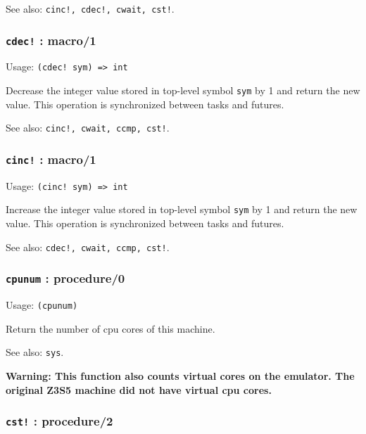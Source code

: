 \documentclass[
]{article}
\newcommand{\passthrough}[1]{#1}
\begin{document}
See also: \passthrough{\lstinline"cinc!, cdec!, cwait, cst!"}.

\hypertarget{cdec-macro1}{%
\subsubsection{\texorpdfstring{\texttt{cdec!} :
macro/1}{cdec! : macro/1}}\label{cdec-macro1}}

Usage: \passthrough{\lstinline"(cdec! sym) => int"}

Decrease the integer value stored in top-level symbol
\passthrough{\lstinline!sym!} by 1 and return the new value. This
operation is synchronized between tasks and futures.

See also: \passthrough{\lstinline"cinc!, cwait, ccmp, cst!"}.

\hypertarget{cinc-macro1}{%
\subsubsection{\texorpdfstring{\texttt{cinc!} :
macro/1}{cinc! : macro/1}}\label{cinc-macro1}}

Usage: \passthrough{\lstinline"(cinc! sym) => int"}

Increase the integer value stored in top-level symbol
\passthrough{\lstinline!sym!} by 1 and return the new value. This
operation is synchronized between tasks and futures.

See also: \passthrough{\lstinline"cdec!, cwait, ccmp, cst!"}.

\hypertarget{cpunum-procedure0}{%
\subsubsection{\texorpdfstring{\texttt{cpunum} :
procedure/0}{cpunum : procedure/0}}\label{cpunum-procedure0}}

Usage: \passthrough{\lstinline!(cpunum)!}

Return the number of cpu cores of this machine.

See also: \passthrough{\lstinline!sys!}.

\textbf{Warning: This function also counts virtual cores on the
emulator. The original Z3S5 machine did not have virtual cpu cores.}

\hypertarget{cst-procedure2}{%
\subsubsection{\texorpdfstring{\texttt{cst!} :
procedure/2}{cst! : procedure/2}}\label{cst-procedure2}}
\end{document}
